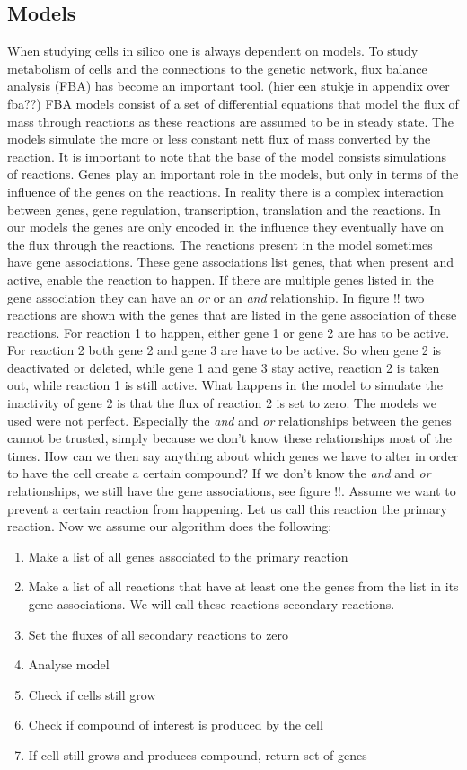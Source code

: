 \documentclass[12pt]{report}
\begin{document}
\subsection{Models}\label{sec:intro_models}
When studying cells in silico one is always dependent on models. To study metabolism of cells and the connections to the genetic network, flux balance analysis (FBA) has become an important tool. (hier een stukje in appendix over fba??)
FBA models consist of a set of differential equations that model the flux of mass through reactions as these reactions are assumed to be in steady state. The models simulate the more or less constant nett flux of mass converted by the reaction.
It is important to note that the base of the model consists simulations of reactions.
Genes play an important role in the models, but only in terms of the influence of the genes on the reactions.
In reality there is a complex interaction between genes, gene regulation, transcription, translation and the reactions.
In our models the genes are only encoded in the influence they eventually have on the flux through the reactions.
The reactions present in the model sometimes have gene associations.
These gene associations list genes, that when present and active, enable the reaction to happen.
If there are multiple genes listed in the gene association they can have an \emph{or} or an \emph{and} relationship.
In figure !! two reactions are shown with the genes that are listed in the gene association of these reactions.
For reaction 1 to happen, either gene 1 or gene 2 are has to be active. For reaction 2 both gene 2 and gene 3 are have to be active. So when gene 2 is deactivated or deleted, while gene 1 and gene 3 stay active, reaction 2 is taken out, while reaction 1 is still active. What happens in the model to simulate the inactivity of gene 2 is that the flux of reaction 2 is set to zero.
The models we used were not perfect. Especially the \emph{and} and \emph{or} relationships between the genes cannot be trusted, simply because we don't know these relationships most of the times.
How can we then say anything about which genes we have to alter in order to have the cell create a certain compound?
If we don't know the \emph{and} and \emph{or} relationships, we still have the gene associations, see figure !!.
Assume we want to prevent a certain reaction from happening. Let us call this reaction the primary reaction. Now we assume our algorithm does the following:
\begin{enumerate}
\item Make a list of all genes associated to the primary reaction
\item Make a list of all reactions that have at least one the genes from the list in its gene associations. We will call these reactions secondary reactions.
\item Set the fluxes of all secondary reactions to zero
\item Analyse model
\item Check if cells still grow
\item Check if compound of interest is produced by the cell
\item If cell still grows and produces compound, return set of genes
\end{enumerate}
\end{document}
